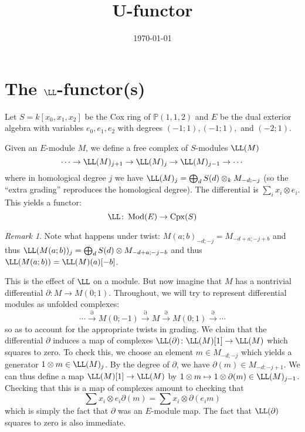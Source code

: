 \documentclass[12pt]{amsart}
\title{U-functor}
\date{\today}
\theoremstyle{definition}
\theoremstyle{remark}
\newtheorem{remark}[lemma]{Remark}
\newcommand{\PP}{\mathbb P}
\def\Mod{\operatorname{Mod}}
\def\Cpx{\operatorname{Cpx}}
\begin{document}
\maketitle



\section{The $\LL$-functor(s)}
Let $S=k[x_0,x_1,x_2]$ be the Cox ring of $\PP(1,1,2)$ and $E$ be the dual exterior algebra with variables $e_0,e_1,e_2$ with degrees $(-1;1), (-1;1),$ and $(-2;1)$.  

Given an $E$-module $M$, we define a free complex of $S$-modules $\LL(M)$
\[
\cdots \to\LL(M)_{j+1}\to  \LL(M)_j\to  \LL(M)_{j-1}\to \cdots
\]
where in homological degree $j$ we have $\LL(M)_j=\bigoplus_{d} S(d)\otimes_k M_{-d;-j}$ (so the ``extra grading'' reproduces the homological degree).  The differential is $\sum_i x_i\otimes e_i$.   This yields a functor:
\[
\LL\colon \Mod(E) \to \Cpx(S)
\]
\begin{remark}\label{rmk:shift and twist}
Note what happens under twist:  $M(a;b)_{-d;-j} = M_{-d+a;-j+b}$ and thus $\LL(M(a;b))_j = \bigoplus_{d} S(d) \otimes M_{-d+a; -j-b}$ and thus $\LL(M(a;b)) =\LL(M)(a)[-b]$. 

\end{remark}

This is the effect of $\LL$ on a module.  But now imagine that $M$ has a nontrivial differential $\partial\colon M\to M(0;1)$.  Throughout, we will try to represent differential modules as unfolded complexes:
\[
\cdots\overset{\partial}{\to}  M(0;-1) \overset{\partial}{\to} M \overset{\partial}{\to} M(0;1)\overset{\partial}{\to} \cdots
 \]
 so as to account for the appropriate twists in grading.  We claim that the differential $\partial$ induces a map of complexes $\LL(\partial)\colon \LL(M)[1]\to \LL(M)$ which squares to zero.  To check this, we choose an element $m\in M_{-d;-j}$ which yields a generator $1\otimes m\in \LL(M)_j$.  By the degree of $\partial$, we have $\partial(m)\in M_{-d;-j+1}$.  We can thus define a map $\LL(M)[1]\to \LL(M)$ by $1\otimes m \mapsto 1\otimes \partial(m)\in \LL(M)_{j-1}$.  Checking that this is a map of complexes amount to checking that
\[
\sum x_i\otimes e_i\partial(m) = \sum x_i \otimes \partial(e_im)
\]
which is simply the fact that $\partial$ was an $E$-module map.  The fact that $\LL(\partial)$ squares to zero is also immediate.
\end{document}

